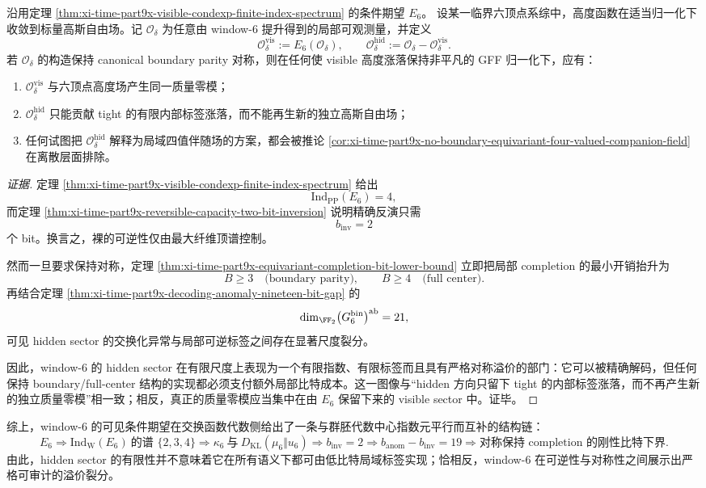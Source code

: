 \begin{conjecture}\label{conj:xi-time-part9x-finite-index-symmetry-premium-visible-gff}
沿用定理 \ref{thm:xi-time-part9x-visible-condexp-finite-index-spectrum} 的条件期望 \(E_6\)。
设某一临界六顶点系综中，高度函数在适当归一化下收敛到标量高斯自由场。记 \(\mathcal O_\delta\) 为任意由 window-\(6\) 提升得到的局部可观测量，并定义
\[
\mathcal O_\delta^{\mathrm{vis}}:=E_6(\mathcal O_\delta),
\qquad
\mathcal O_\delta^{\mathrm{hid}}:=\mathcal O_\delta-\mathcal O_\delta^{\mathrm{vis}}.
\]
若 \(\mathcal O_\delta\) 的构造保持 canonical boundary parity 对称，则在任何使 visible 高度涨落保持非平凡的 GFF 归一化下，应有：
\begin{enumerate}
  \item \(\mathcal O_\delta^{\mathrm{vis}}\) 与六顶点高度场产生同一质量零模；
  \item \(\mathcal O_\delta^{\mathrm{hid}}\) 只能贡献 tight 的有限内部标签涨落，而不能再生新的独立高斯自由场；
  \item 任何试图把 \(\mathcal O_\delta^{\mathrm{hid}}\) 解释为局域四值伴随场的方案，都会被推论 \ref{cor:xi-time-part9x-no-boundary-equivariant-four-valued-companion-field} 在离散层面排除。
\end{enumerate}
\end{conjecture}
\begin{proof}[证据]
定理 \ref{thm:xi-time-part9x-visible-condexp-finite-index-spectrum} 给出
\[
\mathrm{Ind}_{\mathrm{PP}}(E_6)=4,
\]
而定理 \ref{thm:xi-time-part9x-reversible-capacity-two-bit-inversion} 说明精确反演只需
\[
b_{\mathrm{inv}}=2
\]
个 bit。换言之，裸的可逆性仅由最大纤维顶谱控制。

然而一旦要求保持对称，定理
\ref{thm:xi-time-part9x-equivariant-completion-bit-lower-bound} 立即把局部 completion 的最小开销抬升为
\[
B\ge 3
\quad\text{(boundary parity)},
\qquad
B\ge 4
\quad\text{(full center)}.
\]
再结合定理 \ref{thm:xi-time-part9x-decoding-anomaly-nineteen-bit-gap} 的
\[
\dim_{\FF_2}\bigl(G_6^{\mathrm{bin}}\bigr)^{\mathrm{ab}}=21,
\]
可见 hidden sector 的交换化异常与局部可逆标签之间存在显著尺度裂分。

因此，window-\(6\) 的 hidden sector 在有限尺度上表现为一个有限指数、有限标签而且具有严格对称溢价的部门：它可以被精确解码，但任何保持 boundary/full-center 结构的实现都必须支付额外局部比特成本。这一图像与“hidden 方向只留下 tight 的内部标签涨落，而不再产生新的独立质量零模”相一致；相反，真正的质量零模应当集中在由 \(E_6\) 保留下来的 visible sector 中。证毕。
\end{proof}

\noindent
综上，window-\(6\) 的可见条件期望在交换函数代数侧给出了一条与群胚代数中心指数元平行而互补的结构链：
\[
E_6
\Longrightarrow
\mathrm{Ind}_{\mathrm W}(E_6)\ \text{的谱 } \{2,3,4\}
\Longrightarrow
\kappa_6\ \text{与}\ D_{\mathrm{KL}}(\mu_6\Vert u_6)
\Longrightarrow
b_{\mathrm{inv}}=2
\Longrightarrow
b_{\mathrm{anom}}-b_{\mathrm{inv}}=19
\Longrightarrow
\text{对称保持 completion 的刚性比特下界}.
\]
由此，hidden sector 的有限性并不意味着它在所有语义下都可由低比特局域标签实现；恰相反，window-\(6\) 在可逆性与对称性之间展示出严格可审计的溢价裂分。

\endinput
